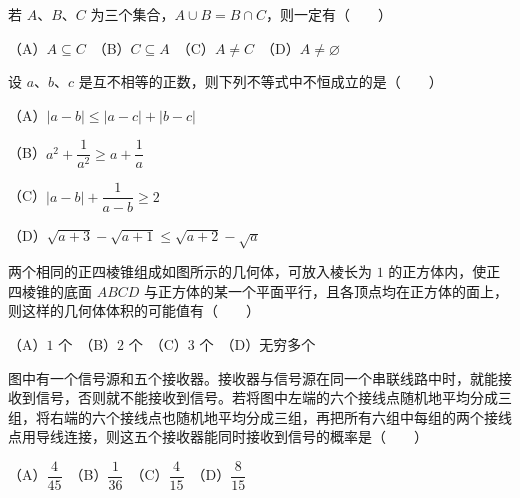 \begin{question}
若 $A\text{、}B\text{、}C$ 为三个集合，$A\cup B=B\cap C$，则一定有\mbox{（　　）}

（A）$A\subseteq C$　（B）$C\subseteq A$　（C）$A\ne C$　（D）$A\ne\varnothing$

\end{question}
\begin{question}
设 $a\text{、}b\text{、}c$ 是互不相等的正数，则下列不等式中不恒成立的是\mbox{（　　）}

（A）$|a-b|\leqslant|a-c|+|b-c|$

（B）$a^2+\dfrac{1}{a^2}\geqslant a+\dfrac{1}{a}$

（C）$|a-b|+\dfrac{1}{a-b}\geqslant2$

（D）$\sqrt{a+3}-\sqrt{a+1}\leqslant\sqrt{a+2}-\sqrt a$

\Needspace{0.4\textheight}
\end{question}
\begin{question}
两个相同的正四棱锥组成如图所示的几何体，可放入棱长为 $1$ 的正方体内，使正四棱锥的底面 $ABCD$ 与正方体的某一个平面平行，且各顶点均在正方体的面上，则这样的几何体体积的可能值有\mbox{（　　）}

（A）$1$ 个　（B）$2$ 个　（C）$3$ 个　（D）无穷多个
\nopagebreak[4]
\begin{center}\end{center}
\nopagebreak[4]
\Needspace{0.4\textheight}
\end{question}
\begin{question}
图中有一个信号源和五个接收器。接收器与信号源在同一个串联线路中时，就能接收到信号，否则就不能接收到信号。若将图中左端的六个接线点随机地平均分成三组，将右端的六个接线点也随机地平均分成三组，再把所有六组中每组的两个接线点用导线连接，则这五个接收器能同时接收到信号的概率是\mbox{（　　）}

（A）$\dfrac{4}{45}$　（B）$\dfrac{1}{36}$　（C）$\dfrac{4}{15}$　（D）$\dfrac{8}{15}$
\nopagebreak[4]
\begin{center}\end{center}
\nopagebreak[4]
\end{question}

